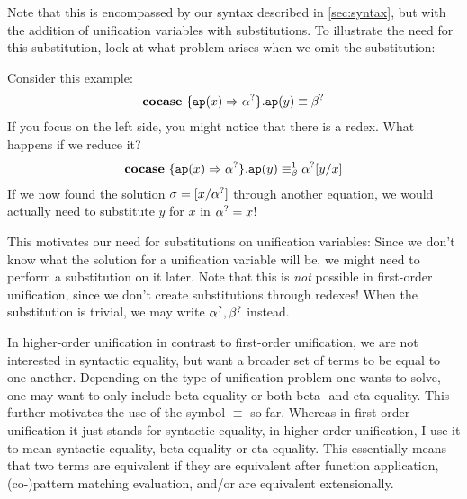 \documentclass[twoside,12pt,a4paper]{article}
\begin{document}
Note that this is encompassed by our syntax described in \cref{sec:syntax},
but with the addition of unification variables with substitutions. 
To illustrate the need for this substitution, look at what problem arises when we omit the substitution:
\begin{example} 
    Consider this example:
    \begin{align*}
        \textbf{cocase}\ \{\texttt{ap}(x)\Rightarrow\alpha^?\}.\texttt{ap}(y)\equiv\beta^?
    \end{align*}
    If you focus on the left side, you might notice that there is a redex. What happens if we reduce it?
    \begin{align*}
        \textbf{cocase}\ \{\texttt{ap}(x)\Rightarrow\alpha^?\}.\texttt{ap}(y)\equiv_{\beta}^1\alpha^?[y/x]    
    \end{align*}     
    If we now found the solution $\sigma = [x/ \alpha^?]$ through another equation, we would actually need to substitute $y$ for $x$ in $\alpha^? = x$!
\end{example}

This motivates our need for substitutions on unification variables: 
Since we don't know what the solution for a unification variable will be, we might need to perform a substitution on it later.
Note that this is \textit{not} possible in first-order unification, since we don't create substitutions through redexes! 
When the substitution is trivial, we may  write $\alpha^?, \beta^?$ instead.

In higher-order unification in contrast to first-order unification, we are not interested in syntactic equality, but want a broader set of terms to be equal to one another.
Depending on the type of unification problem one wants to solve, one may want to only include beta-equality or both beta- and eta-equality.
This further motivates the use of the symbol $\equiv$ so far. Whereas in first-order unification it just stands for syntactic equality, 
in higher-order unification, I use it to mean syntactic equality, beta-equality or eta-equality.
This essentially means that two terms are equivalent if they are equivalent after function application, (co-)pattern matching evaluation, and/or are equivalent extensionally.
\end{document}
